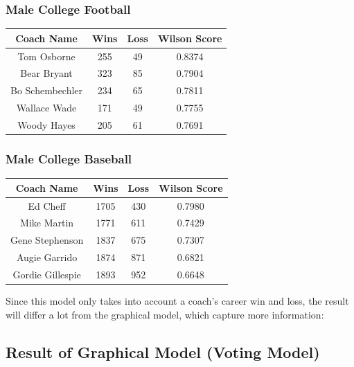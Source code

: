 \documentclass[titlepage,12pt]{article}
\begin{document}
\subsubsection*{Male College Football}

\begin{center}
\begin{tabular}{ | c | c | c| c |}
\hline
Coach Name       & Wins  & Loss & Wilson Score \\\hline
Tom Osborne      & 255   & 49   & 0.8374 \\\hline
Bear Bryant      & 323   & 85   & 0.7904 \\\hline
Bo Schembechler  & 234   & 65   & 0.7811 \\\hline
Wallace Wade     & 171   & 49   & 0.7755 \\\hline
Woody Hayes      & 205   & 61   & 0.7691 \\
\hline
\end{tabular}
\end{center}

\subsubsection*{Male College Baseball}

\begin{center}
\begin{tabular}{ | c | c | c| c | }
\hline
Coach Name       & Wins   & Loss & Wilson Score \\\hline
Ed Cheff         & 1705   & 430  & 0.7980 \\\hline
Mike Martin      & 1771   & 611  & 0.7429 \\\hline
Gene Stephenson  & 1837   & 675  & 0.7307 \\\hline
Augie Garrido    & 1874   & 871  & 0.6821 \\\hline
Gordie Gillespie & 1893   & 952  & 0.6648 \\
\hline
\end{tabular}
\end{center}

\noindent Since this model only takes into account a coach's career win and loss, the result will differ a lot from the graphical model, which capture more information:

\subsection{Result of Graphical Model (Voting Model)}
\end{document}
